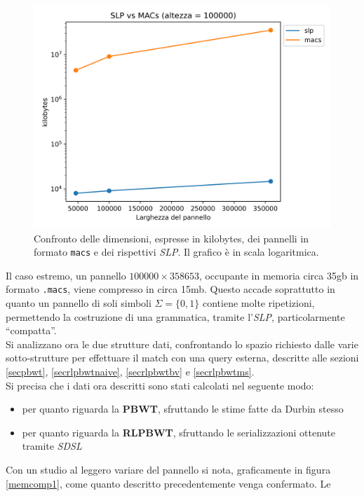 \begin{figure}
  \centering
  \includegraphics[scale = 0.6]{img/slp_vs_macs2.png}
  \caption{Confronto delle dimensioni, espresse in kilobytes, dei pannelli in
    formato \texttt{macs} e dei rispettivi \textit{SLP}. Il grafico è in scala
    logaritmica.}
  \label{fig:slpres2}
\end{figure}
Il caso estremo, un pannello $100000\times 358653$, occupante in memoria
circa 35gb in formato \texttt{.macs}, viene compresso in circa 15mb. Questo
accade soprattutto in quanto un pannello di soli simboli $\Sigma=\{0,1\}$
contiene molte ripetizioni, permettendo la costruzione di una grammatica,
tramite l'\textit{SLP}, particolarmente ``compatta''.\\
Si analizzano ora le due strutture dati, confrontando lo spazio richiesto dalle
varie sotto-strutture per effettuare il match con una query esterna, descritte
alle sezioni \ref{secpbwt}, \ref{secrlpbwtnaive}, \ref{secrlpbwtbv} e
\ref{secrlpbwtms}.\\
Si precisa che i dati ora descritti sono stati calcolati nel seguente modo:
\begin{itemize}
  \item per quanto riguarda la \textbf{PBWT}, sfruttando le stime fatte da
  Durbin stesso
  \item per quanto riguarda la \textbf{RLPBWT}, sfruttando le serializzazioni
  ottenute tramite \textit{SDSL}
\end{itemize}
Con un studio al leggero variare del pannello si nota, graficamente in figura
\ref{memcomp1}, come quanto descritto precedentemente venga confermato. Le
